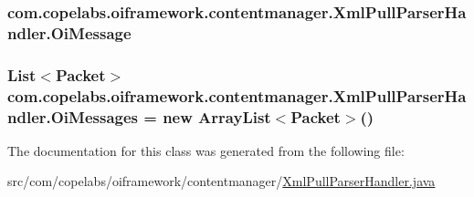 \subsubsection[{Oi\+Message}]{ com.\+copelabs.\+oiframework.\+contentmanager.\+Xml\+Pull\+Parser\+Handler.\+Oi\+Message\hspace{0.3cm}{\ttfamily [private]}}\label{classcom_1_1copelabs_1_1oiframework_1_1contentmanager_1_1_xml_pull_parser_handler_a1f117f2bfb10ad89085ef85c55f6cc9c}
\hypertarget{classcom_1_1copelabs_1_1oiframework_1_1contentmanager_1_1_xml_pull_parser_handler_a4e6660ea84c1f1594aaec8f8b7cb98a8}{}
\subsubsection[{Oi\+Messages}]{\setlength{\rightskip}{0pt plus 5cm}List$<${\bf Packet}$>$ com.\+copelabs.\+oiframework.\+contentmanager.\+Xml\+Pull\+Parser\+Handler.\+Oi\+Messages = new Array\+List$<${\bf Packet}$>$()\hspace{0.3cm}{\ttfamily [private]}}\label{classcom_1_1copelabs_1_1oiframework_1_1contentmanager_1_1_xml_pull_parser_handler_a4e6660ea84c1f1594aaec8f8b7cb98a8}


The documentation for this class was generated from the following file\+:\begin{DoxyCompactItemize}
\item 
src/com/copelabs/oiframework/contentmanager/\hyperlink{_xml_pull_parser_handler_8java}{Xml\+Pull\+Parser\+Handler.\+java}\end{DoxyCompactItemize}
